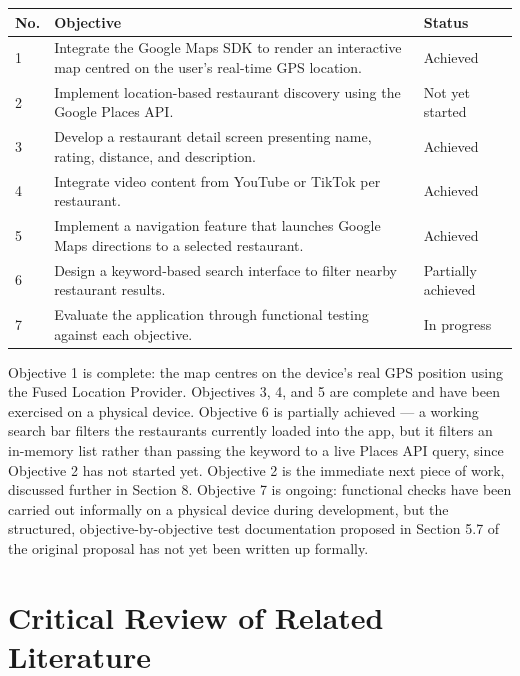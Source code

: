 \documentclass[12pt, a4paper]{article}
\begin{document}
\begin{center}
\renewcommand{\arraystretch}{1.3}
\begin{tabular}{p{} p{} p{}}
\toprule
\textbf{No.} & \textbf{Objective} & \textbf{Status} \\
\midrule
1 & Integrate the Google Maps SDK to render an interactive map centred on the user's real-time GPS location. & Achieved \\
2 & Implement location-based restaurant discovery using the Google Places API. & Not yet started \\
3 & Develop a restaurant detail screen presenting name, rating, distance, and description. & Achieved \\
4 & Integrate video content from YouTube or TikTok per restaurant. & Achieved \\
5 & Implement a navigation feature that launches Google Maps directions to a selected restaurant. & Achieved \\
6 & Design a keyword-based search interface to filter nearby restaurant results. & Partially achieved \\
7 & Evaluate the application through functional testing against each objective. & In progress \\
\bottomrule
\end{tabular}
\end{center}

Objective 1 is complete: the map centres on the device's real GPS position using the Fused Location Provider. Objectives 3, 4, and 5 are complete and have been exercised on a physical device. Objective 6 is partially achieved — a working search bar filters the restaurants currently loaded into the app, but it filters an in-memory list rather than passing the keyword to a live Places API query, since Objective 2 has not started yet. Objective 2 is the immediate next piece of work, discussed further in Section 8. Objective 7 is ongoing: functional checks have been carried out informally on a physical device during development, but the structured, objective-by-objective test documentation proposed in Section 5.7 of the original proposal has not yet been written up formally.

\section{Critical Review of Related Literature}
\end{document}
